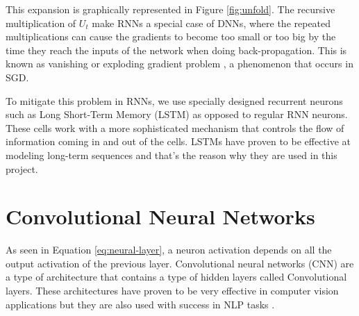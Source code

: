 This expansion is graphically represented in Figure \ref{fig:unfold}. The recursive multiplication of $U_t$ make RNNs a special case of DNNs, where the repeated multiplications can cause the gradients to become too small or too big by the time they reach the inputs of the network when doing back-propagation. This is known as vanishing or exploding gradient problem \cite{bengio1994learning}, a phenomenon that occurs in SGD.

To mitigate this problem in RNNs, we use specially designed recurrent neurons such as Long Short-Term Memory \cite{hochreiter1997long} (LSTM) as opposed to regular RNN neurons. These cells work with a more sophisticated mechanism that controls the flow of information coming in and out of the cells. LSTMs have proven to be effective at modeling long-term sequences and that's the reason why they are used in this project.

\section{Convolutional Neural Networks}

As seen in Equation \eqref{eq:neural-layer}, a neuron activation depends on all the output activation of the previous layer. Convolutional neural networks (CNN) are a type of architecture that contains a type of hidden layers called Convolutional layers. These architectures have proven to be very effective in computer vision applications but they are also used with success in NLP tasks \cite{zhang2015character}.

